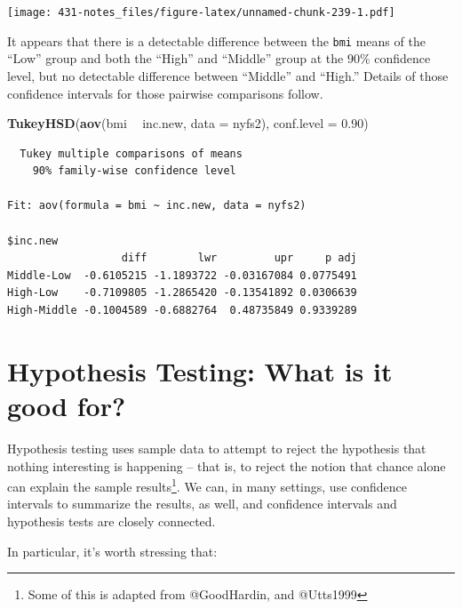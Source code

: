 \documentclass[
]{book}
\newenvironment{Shaded}{\begin{snugshade}}{\end{snugshade}}
\newcommand{\DataTypeTok}[1]{\textcolor[rgb]{0.13,0.29,0.53}{#1}}
\newcommand{\FloatTok}[1]{\textcolor[rgb]{0.00,0.00,0.81}{#1}}
\newcommand{\KeywordTok}[1]{\textcolor[rgb]{0.13,0.29,0.53}{\textbf{#1}}}
\newcommand{\NormalTok}[1]{#1}
\newcommand{\OperatorTok}[1]{\textcolor[rgb]{0.81,0.36,0.00}{\textbf{#1}}}
\newcommand{\StringTok}[1]{\textcolor[rgb]{0.31,0.60,0.02}{#1}}
\begin{document}
\texttt{[image: 431-notes\_files/figure-latex/unnamed-chunk-239-1.pdf]}

It appears that there is a detectable difference between the \texttt{bmi} means of the ``Low'' group and both the ``High'' and ``Middle'' group at the 90\% confidence level, but no detectable difference between ``Middle'' and ``High.'' Details of those confidence intervals for those pairwise comparisons follow.

\begin{Shaded}
\begin{Highlighting}[]
\KeywordTok{TukeyHSD}\NormalTok{(}\KeywordTok{aov}\NormalTok{(bmi }\OperatorTok{~}\StringTok{ }\NormalTok{inc.new, }\DataTypeTok{data =}\NormalTok{ nyfs2),}
                  \DataTypeTok{conf.level =} \FloatTok{0.90}\NormalTok{)}
\end{Highlighting}
\end{Shaded}

\begin{verbatim}
  Tukey multiple comparisons of means
    90% family-wise confidence level

Fit: aov(formula = bmi ~ inc.new, data = nyfs2)

$inc.new
                  diff        lwr         upr     p adj
Middle-Low  -0.6105215 -1.1893722 -0.03167084 0.0775491
High-Low    -0.7109805 -1.2865420 -0.13541892 0.0306639
High-Middle -0.1004589 -0.6882764  0.48735849 0.9339289
\end{verbatim}

\hypertarget{hypothesis-testing-what-is-it-good-for}{%
\chapter{Hypothesis Testing: What is it good for?}\label{hypothesis-testing-what-is-it-good-for}}

Hypothesis testing uses sample data to attempt to reject the hypothesis that nothing interesting is happening -- that is, to reject the notion that chance alone can explain the sample results\footnote{Some of this is adapted from @GoodHardin, and @Utts1999}. We can, in many settings, use confidence intervals to summarize the results, as well, and confidence intervals and hypothesis tests are closely connected.

In particular, it's worth stressing that:
\end{document}
